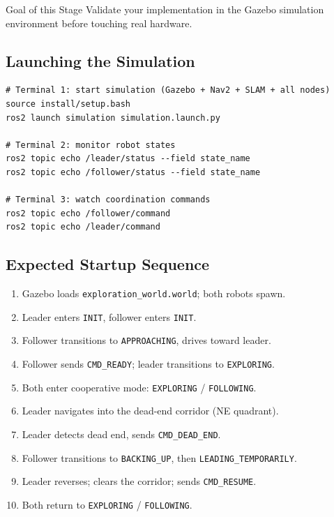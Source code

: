 \documentclass[11pt, a4paper]{article}
\begin{document}
\begin{infobox}{Goal of this Stage}
Validate your implementation in the Gazebo simulation environment before
touching real hardware.
\end{infobox}

\subsection{Launching the Simulation}

\begin{lstlisting}[style=shellcode]
# Terminal 1: start simulation (Gazebo + Nav2 + SLAM + all nodes)
source install/setup.bash
ros2 launch simulation simulation.launch.py

# Terminal 2: monitor robot states
ros2 topic echo /leader/status --field state_name
ros2 topic echo /follower/status --field state_name

# Terminal 3: watch coordination commands
ros2 topic echo /follower/command
ros2 topic echo /leader/command
\end{lstlisting}

\subsection{Expected Startup Sequence}

\begin{enumerate}
  \item Gazebo loads \texttt{exploration\_world.world}; both robots spawn.
  \item Leader enters \texttt{INIT}, follower enters \texttt{INIT}.
  \item Follower transitions to \texttt{APPROACHING}, drives toward leader.
  \item Follower sends \texttt{CMD\_READY}; leader transitions to \texttt{EXPLORING}.
  \item Both enter cooperative mode: \texttt{EXPLORING} / \texttt{FOLLOWING}.
  \item Leader navigates into the dead-end corridor (NE quadrant).
  \item Leader detects dead end, sends \texttt{CMD\_DEAD\_END}.
  \item Follower transitions to \texttt{BACKING\_UP}, then \texttt{LEADING\_TEMPORARILY}.
  \item Leader reverses; clears the corridor; sends \texttt{CMD\_RESUME}.
  \item Both return to \texttt{EXPLORING} / \texttt{FOLLOWING}.
\end{enumerate}
\end{document}
